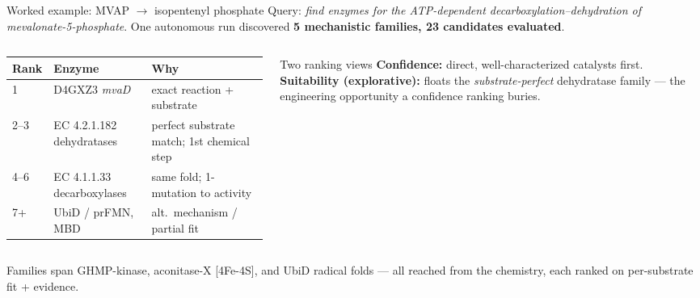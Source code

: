 \documentclass[aspectratio=169, 11pt]{beamer}
\begin{document}
\begin{frame}{Worked example: MVAP $\rightarrow$ isopentenyl phosphate}
  \footnotesize
  Query: \emph{find enzymes for the ATP-dependent decarboxylation--dehydration of
  mevalonate-5-phosphate}. One autonomous run discovered
  \textbf{5 mechanistic families, 23 candidates evaluated}.
  \medskip
  \begin{columns}[T]
    \begin{column}{0.6\textwidth}
      \renewcommand{\arraystretch}{1.15}
      \begin{tabular}{@{}p{1.5cm}p{2.2cm}p{2.4cm}@{}}
        \hline
        \textbf{Rank} & \textbf{Enzyme} & \textbf{Why} \\ \hline
        1 & D4GXZ3 \emph{mvaD} & exact reaction + substrate \\
        2--3 & EC 4.2.1.182 dehydratases & perfect substrate match; 1st chemical step \\
        4--6 & EC 4.1.1.33 decarboxylases & same fold; 1-mutation to activity \\
        7+ & UbiD / prFMN, MBD & alt.\ mechanism / partial fit \\ \hline
      \end{tabular}
    \end{column}
    \begin{column}{0.4\textwidth}
      \begin{block}{Two ranking views}
        \scriptsize
        \textbf{Confidence:} direct, well-characterized catalysts first. \\[3pt]
        \textbf{Suitability (explorative):} floats the \emph{substrate-perfect}
        dehydratase family --- the engineering opportunity a confidence ranking buries.
      \end{block}
    \end{column}
  \end{columns}
  \vfill
  \centering\scriptsize\color{darkgray}
  Families span GHMP-kinase, aconitase-X [4Fe-4S], and UbiD radical folds ---
  all reached from the chemistry, each ranked on per-substrate fit + evidence.
\end{frame}
\end{document}
